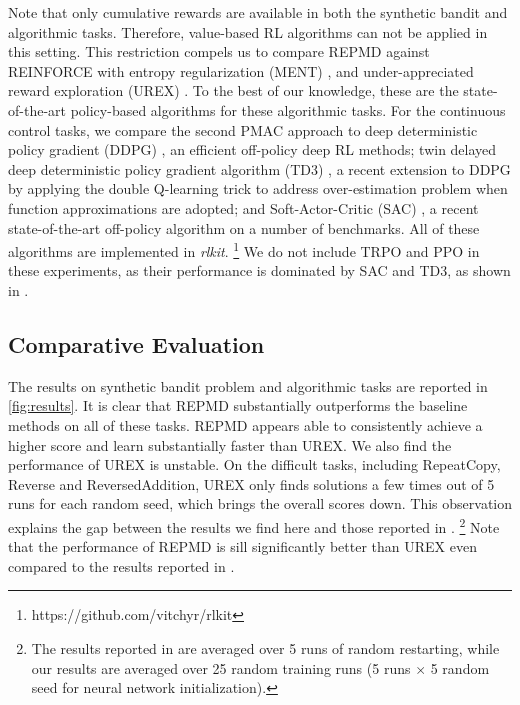 Note that only cumulative rewards are available in both the
synthetic bandit and algorithmic tasks.
Therefore, value-based RL algorithms can not be applied in this setting.
This restriction compels us to compare REPMD against
REINFORCE with entropy regularization (MENT) \citep{williams1992simple},
and under-appreciated reward exploration (UREX) \citep{nachum2017improving}.
To the best of our knowledge,
these
are the state-of-the-art policy-based algorithms for these algorithmic tasks. 
%
For the continuous control tasks, we compare the second PMAC approach
to deep deterministic policy gradient (DDPG) \citep{lillicrap2015continuous},
an efficient off-policy deep RL methods;
twin delayed deep deterministic policy gradient algorithm (TD3)
\citep{fujimoto2018addressing},
a recent extension to DDPG by applying the double Q-learning trick
to address over-estimation problem when function approximations are adopted;
and Soft-Actor-Critic (SAC) \citep{haarnoja2018soft},
a recent state-of-the-art off-policy algorithm on a number of benchmarks.
All of these algorithms are implemented in \emph{rlkit}.%
%
\footnote{
https://github.com/vitchyr/rlkit
} 
We do not include TRPO and PPO in these experiments,
as their performance is dominated by SAC and TD3,
as shown in \citep{haarnoja2018soft,fujimoto2018addressing}. 


\subsection{Comparative Evaluation}

The results on synthetic bandit problem and algorithmic tasks are reported 
in \cref{fig:results}. 
It is clear that REPMD substantially outperforms the baseline methods
on all of these tasks.
REPMD appears able to consistently achieve a higher score and
learn substantially faster than UREX.
We also find the performance of UREX is unstable.
On the difficult tasks, including RepeatCopy, Reverse and ReversedAddition,
UREX only finds solutions a few times out of 5 runs for each random seed,
which brings the overall scores down.
This observation explains the gap between the results we find here
and those reported in \citet{nachum2017improving}.%
%
\footnote{
The results reported in \citep{nachum2017improving} are averaged over 
5 runs of random restarting,
while our results are averaged over 25 random training runs
(5 runs $\times$ 5 random seed for neural network initialization). 
}
Note that the performance of REPMD is sill significantly better than
UREX even compared to the results reported in \citet{nachum2017improving}. 

